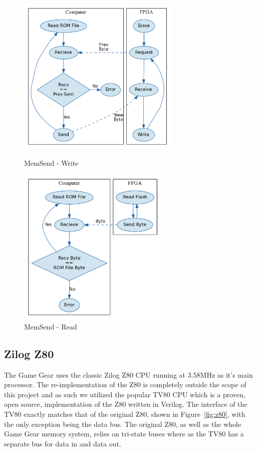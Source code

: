 \documentclass{article}
\begin{document}
\begin{figure}[H]
    \centering
    \begin{minipage}[b]{0.45\linewidth}
        \centering
        \includegraphics[width=\textwidth, height=3in]{../../fpga/rom_flasher/doc/block_diagram_write.png}
        \caption{MemSend - Write}
        \label{fig:rom_write}
    \end{minipage}
    \hfill
    \begin{minipage}[b]{0.45\linewidth}
        \centering
        \includegraphics[width=\textwidth, height=3in]{../../fpga/rom_flasher/doc/block_diagram_read.png}
        \caption{MemSend - Read}
        \label{fig:rom_read}
    \end{minipage}
\end{figure}

\subsection{Zilog Z80}
The Game Gear uses the classic Zilog Z80 CPU running at 3.58MHz as it's main
processor.  The re-implementation of the Z80 is completely outside the scope of
this project and as such we utilized the popular TV80 \cite{tv80} CPU which is
a proven, open source, implementation of the Z80 written in Verilog.  The
interface of the TV80 exactly matches that of the original Z80, shown in
Figure~\ref{fig:z80}, with the only exception being the data bus. The original
Z80, as well as the whole Game Gear memory system, relies on tri-state buses
where as the TV80 has a separate bus for data in and data out.
\end{document}
